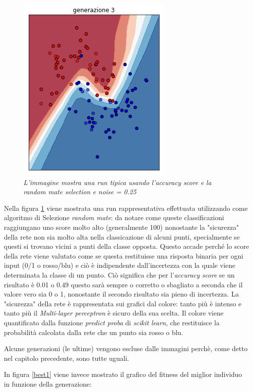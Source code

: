 \documentclass[12pt,a4paper]{report}
\begin{document}
\begin{figure}[H]
 \includegraphics[scale = 0.4]{images/moons-rnd-acc./3}
 \caption{\textit{L'immagine mostra una run tipica usando l'accuracy score e la random mate selection e noise = 0.25}}
 \label{moons1}
\end{figure}

Nella figura \ref{moons1} viene mostrata una run rappresentativa effettuata utilizzando come algoritmo di Selezione \textit{random mate}: da notare come queste classificazioni raggiungano uno score molto alto (generalmente 100\textdiscount) nonostante la "sicurezza" della rete non sia molto alta nella classicazione di alcuni punti, specialmente se questi si trovano vicini a punti della classe opposta.
Questo accade perché lo score della rete viene valutato come se questa restituisse una risposta binaria per ogni input (0/1 o rosso/blu) e ciò è indipendente dall'incertezza con la quale viene determinata la classe di un punto. 
Ciò significa che per l'\textit{accuracy score} se un risultato è 0.01 o 0.49 questo sarà sempre o corretto o sbagliato a seconda che il valore vero sia 0 o 1, nonostante il secondo risultato sia pieno di incertezza.  
La "sicurezza" della rete è rappresentata sui grafici dal colore: tanto più è intenso e tanto  più il \textit{Multi-layer perceptron} è sicuro della sua scelta.
Il colore viene quantificato dalla funzione \textit{predict proba} di \textit{scikit learn}, che restituisce la probabilità calcolata dalla rete che un punto sia rosso o blu.

Alcune generazioni (le ultime) vengono escluse dalle immagini perchè, come detto nel capitolo precedente, sono tutte uguali.

In figura \ref{best1} viene invece mostrato il grafico del fitness del miglior individuo in funzione della generazione:
\end{document}
